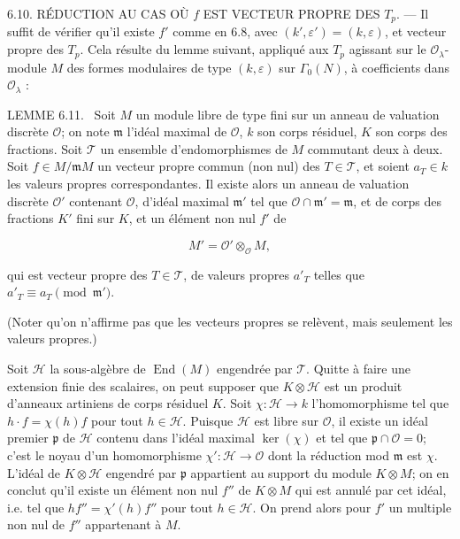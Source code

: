 \documentclass[10pt,oneside]{article}
\begin{document}
6.10. RÉDUCTION AU CAS OÙ \(f\) EST VECTEUR PROPRE DES \(T_p\). — Il suffit de vérifier qu'il existe \(f'\) comme en 6.8, avec \((k',\varepsilon')=(k,\varepsilon)\), et vecteur propre des \(T_p\). Cela résulte du lemme suivant, appliqué aux \(T_p\) agissant sur le \(\mathcal{O}_\lambda\)-module \(M\) des formes modulaires de type \((k,\varepsilon)\) sur \(\Gamma_0(N)\), à coefficients dans \(\mathcal{O}_\lambda\) :\par

\noindent\textsc{LEMME 6.11.} \textemdash\ Soit \(M\) un module libre de type fini sur un anneau de valuation discrète \(\mathcal{O}\); on note \(\mathfrak m\) l'idéal maximal de \(\mathcal{O}\), \(k\) son corps résiduel, \(K\) son corps des fractions. Soit \(\mathcal T\) un ensemble d'endomorphismes de \(M\) commutant deux à deux. Soit \(f\in M/\mathfrak mM\) un vecteur propre commun (non nul) des \(T\in\mathcal T\), et soient \(a_T\in k\) les valeurs propres correspondantes. Il existe alors un anneau de valuation discrète \(\mathcal{O}'\) contenant \(\mathcal{O}\), d'idéal maximal \(\mathfrak m'\) tel que \(\mathcal{O}\cap\mathfrak m'=\mathfrak m\), et de corps des fractions \(K'\) fini sur \(K\), et un élément non nul \(f'\) de\par

\begin{equation*}
M'=\mathcal{O}'\otimes_{\mathcal{O}}M,
\end{equation*}

qui est vecteur propre des \(T\in\mathcal T\), de valeurs propres \(a'_T\) telles que \(a'_T\equiv a_T\pmod{\mathfrak m'}\).\par

(Noter qu'on n'affirme pas que les vecteurs propres se relèvent, mais seulement les valeurs propres.)\par

Soit \(\mathcal H\) la sous-algèbre de \(\operatorname{End}(M)\) engendrée par \(\mathcal T\). Quitte à faire une extension finie des scalaires, on peut supposer que \(K\otimes\mathcal H\) est un produit d'anneaux artiniens de corps résiduel \(K\). Soit \(\chi:\mathcal H\longrightarrow k\) l'homomorphisme tel que \(h\cdot f=\chi(h)f\) pour tout \(h\in\mathcal H\). Puisque \(\mathcal H\) est libre sur \(\mathcal O\), il existe un idéal premier \(\mathfrak p\) de \(\mathcal H\) contenu dans l'idéal maximal \(\ker(\chi)\) et tel que \(\mathfrak p\cap\mathcal O=0\); c'est le noyau d'un homomorphisme \(\chi':\mathcal H\longrightarrow\mathcal O\) dont la réduction mod \(\mathfrak m\) est \(\chi\). L'idéal de \(K\otimes\mathcal H\) engendré par \(\mathfrak p\) appartient au support du module \(K\otimes M\); on en conclut qu'il existe un élément non nul \(f''\) de \(K\otimes M\) qui est annulé par cet idéal, i.e. tel que \(hf''=\chi'(h)f''\) pour tout \(h\in\mathcal H\). On prend alors pour \(f'\) un multiple non nul de \(f''\) appartenant à \(M\).\par
\end{document}
